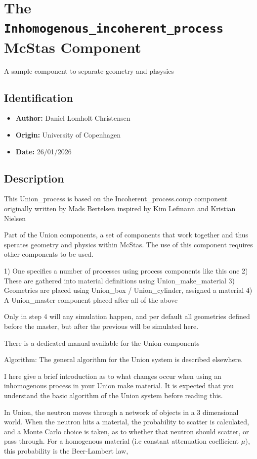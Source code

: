 \section{The \texttt{Inhomogenous\_incoherent\_process} McStas Component}
A sample component to separate geometry and phsysics

\subsection*{Identification}
\begin{itemize}
  \item \textbf{Author:} Daniel Lomholt Christensen
  \item \textbf{Origin:} University of Copenhagen
  \item \textbf{Date:} 26/01/2026
\end{itemize}

\subsection*{Description}
This Union\_process is based on the Incoherent\_process.comp component originally written by Mads Bertelsen inspired by Kim Lefmann and Kristian Nielsen

Part of the Union components, a set of components that work together and thus sperates geometry and physics within McStas. The use of this component requires other components to be used.

1) One specifies a number of processes using process components like this one 2) These are gathered into material definitions using Union\_make\_material 3) Geometries are placed using Union\_box / Union\_cylinder, assigned a material 4) A Union\_master component placed after all of the above

Only in step 4 will any simulation happen, and per default all geometries defined before the master, but after the previous will be simulated here.

There is a dedicated manual available for the Union components

Algorithm: The general algorithm for the Union system is described elsewhere.

I here give a brief introduction as to what changes occur when using an inhomogenous process in your Union make material. It is expected that you understand the basic algorithm of the Union system before reading this.

In Union, the neutron moves through a network of objects in a 3 dimensional world. When the neutron hits a material, the probability to scatter is calculated, and a Monte Carlo choice is taken, as to whether that neutron should scatter, or pass through. For a homogenous material (i.e constant attenuation coefficient $\mu$), this probability is the Beer-Lambert law,

